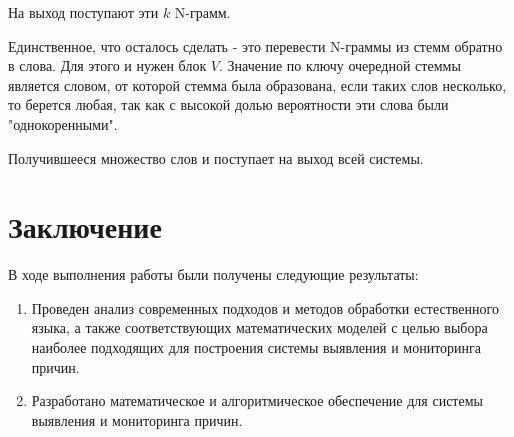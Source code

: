 \documentclass[a4paper,12pt,preview]{report} %
\begin{document}
	 На выход поступают эти $k$ N-грамм. 
	 
	 Единственное, что осталось сделать - это перевести N-граммы из стемм обратно в слова. Для этого и нужен блок $V$. Значение по ключу очередной стеммы является словом, от которой стемма была образована, если таких слов несколько, то берется любая, так как с высокой долью вероятности эти слова были "однокоренными".
	 
	 Получившееся множество слов и поступает на выход всей системы.
	 
	 
	
	
	
	\chapter*{Заключение}
	
	В ходе выполнения работы были получены следующие результаты:
	
	\begin{enumerate}
		\item Проведен анализ современных подходов и методов обработки естественного языка, а также соответствующих математических моделей с целью выбора наиболее подходящих для построения системы выявления и мониторинга причин.
		
		\item Разработано математическое и алгоритмическое обеспечение для системы выявления и мониторинга причин.
		
		
	\end{enumerate}
	
	
	
\end{document}
